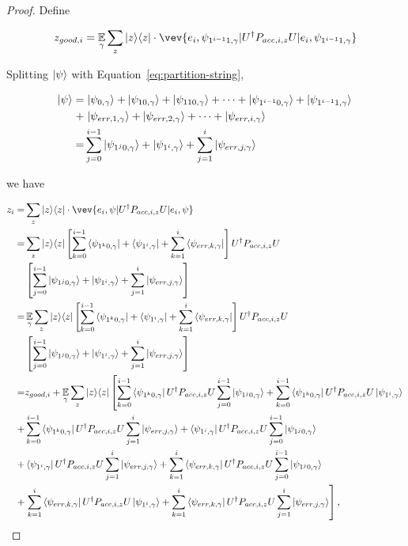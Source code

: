\begin{proof}
Define

\begin{align}
	z_{good,i}=\E_\gamma \sum_z \proj{z} \cdot \vev{e_i,\psi_{1^{i-1}1,\gamma}|U^\dag P_{acc,i,z} U|e_i,\psi_{1^{i-1}1,\gamma}}
\end{align}

Splitting $\ket{\psi}$ with Equation~\ref{eq:partition-string},

\begin{align}
	\ket{\psi}=& \left. \ket{\psi_{0,\gamma}}+\ket{\psi_{10,\gamma}}+\ket{\psi_{110,\gamma}}+\cdots+\ket{\psi_{1^{i-1}0,\gamma}}+
	\ket{\psi_{1^{i-1}1,\gamma}} \right. \nonumber \\
	 +& \left.\ket{\psi_{err,1,\gamma}}+\ket{\psi_{err,2,\gamma}}+\cdots+\ket{\psi_{err,i,\gamma}}\right. \nonumber \\
	 =& \sum_{j=0}^{i-1} \ket{\psi_{1^j0,\gamma}} +\ket{\psi_{1^i,\gamma}} +\sum_{j=1}^{i}\ket{\psi_{err,j,\gamma}}
\end{align}


we have

\begin{align}
	z_i =& \sum_z \proj{z} \cdot \vev{e_i,\psi|U^\dag P_{acc,i,z} U|e_i,\psi} \nn \\
	=& \sum_z \proj{z} \L[\sum_{k=0}^{i-1} \bra{\psi_{1^k0,\gamma}} +\bra{\psi_{1^i,\gamma}} +\sum_{k=1}^{i}\bra{\psi_{err,k,\gamma}} \R]U^\dag  P_{acc,i,z} U\nn \\
	&\L[ \sum_{j=0}^{i-1} \ket{\psi_{1^j0,\gamma}} +\ket{\psi_{1^i,\gamma}} +\sum_{j=1}^{i}\ket{\psi_{err,j,\gamma}}\R]  \nn \\
	=& \E_\gamma \sum_z \proj{z} \L[\sum_{k=0}^{i-1} \bra{\psi_{1^k0,\gamma}} +\bra{\psi_{1^i,\gamma}} +\sum_{k=1}^{i}\bra{\psi_{err,k,\gamma}} \R]U^\dag  P_{acc,i,z} U\nn \\
	&\L[ \sum_{j=0}^{i-1} \ket{\psi_{1^j0,\gamma}} +\ket{\psi_{1^i,\gamma}} +\sum_{j=1}^{i}\ket{\psi_{err,j,\gamma}}\R]  \nn \\
	=& z_{good,i}+ \E_\gamma \sum_z \proj{z} \L[\sum_{k=0}^{i-1} \bra{\psi_{1^k0,\gamma}}U^\dag  P_{acc,i,z}U   \sum_{j=0}^{i-1} \ket{\psi_{1^j0,\gamma}}+
	\sum_{k=0}^{i-1} \bra{\psi_{1^k0,\gamma}}U^\dag  P_{acc,i,z}U \ket{\psi_{1^i,\gamma}}  \R. \nn \\
	  +&  \sum_{k=0}^{i-1} \bra{\psi_{1^k0,\gamma}}U^\dag  P_{acc,i,z}U\sum_{j=1}^{i}\ket{\psi_{err,j,\gamma}}
	+\bra{\psi_{1^i,\gamma}} U^\dag  P_{acc,i,z}U \sum_{j=0}^{i-1} \ket{\psi_{1^j0,\gamma}}
	\nn \\
	+&  \bra{\psi_{1^i,\gamma}} U^\dag  P_{acc,i,z}U \sum_{j=1}^{i}\ket{\psi_{err,j,\gamma}}
	+\sum_{k=1}^{i}\bra{\psi_{err,k,\gamma}} U^\dag  P_{acc,i,z}U  \sum_{j=0}^{i-1} \ket{\psi_{1^j0,\gamma}}
	\nn \\
	+&\L.   \sum_{k=1}^{i}\bra{\psi_{err,k,\gamma}} U^\dag  P_{acc,i,z}U \ket{\psi_{1^i,\gamma}} +\sum_{k=1}^{i}\bra{\psi_{err,k,\gamma}} U^\dag  P_{acc,i,z}U \sum_{j=1}^{i}\ket{\psi_{err,j,\gamma}} \R] , \nn     
\end{align}


\end{proof}
